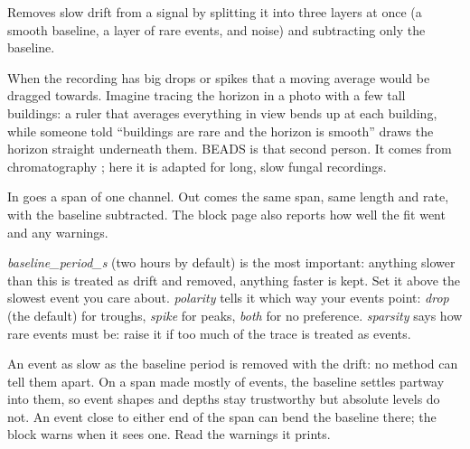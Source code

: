 Removes slow drift from a signal by splitting it into three layers at once (a smooth baseline,
a layer of rare events, and noise) and subtracting only the baseline.

When the recording has big drops or spikes that a moving average would be dragged towards.
Imagine tracing the horizon in a photo with a few tall buildings: a ruler that averages
everything in view bends up at each building, while someone told ``buildings are rare and
the horizon is smooth'' draws the horizon straight underneath them. BEADS is that second
person. It comes from chromatography \citep{ning2014chromatogram}; here it is adapted for long,
slow fungal recordings.

In goes a span of one channel. Out comes the same span, same length and rate, with the baseline
subtracted. The block page also reports how well the fit went and any warnings.

\emph{baseline\_period\_s} (two hours by default) is the most important: anything slower than
this is treated as drift and removed, anything faster is kept. Set it above the slowest event
you care about. \emph{polarity} tells it which way your events point: \emph{drop} (the default)
for troughs, \emph{spike} for peaks, \emph{both} for no preference. \emph{sparsity} says how
rare events must be: raise it if too much of the trace is treated as events.

An event as slow as the baseline period is removed with the drift: no method can tell them
apart. On a span made mostly of events, the baseline settles partway into them, so event shapes
and depths stay trustworthy but absolute levels do not. An event close to either end of the
span can bend the baseline there; the block warns when it sees one. Read the warnings it prints.
